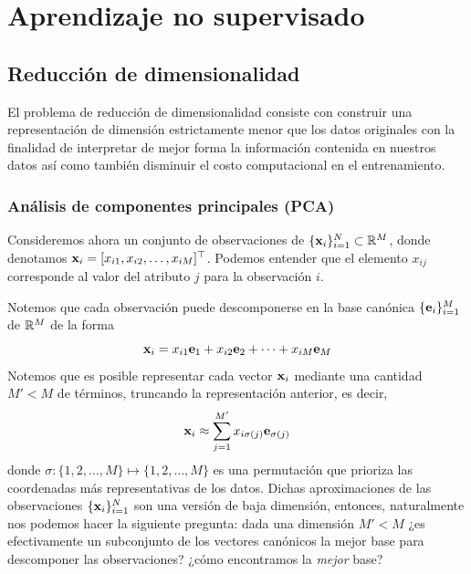 
\section{Aprendizaje no supervisado}

\subsection{Reducción de dimensionalidad}

El problema de reducción de dimensionalidad consiste con construir una representación de dimensión estrictamente menor que los datos originales con la finalidad de interpretar de mejor forma la información contenida en nuestros datos así como también disminuir el costo computacional en el entrenamiento.

\subsubsection{Análisis de componentes principales (PCA)}

Consideremos ahora un conjunto de observaciones de $\{\mathbf{x}_i\}_{i=1}^N\subset\mathbb{R}^M$, donde denotamos $\mathbf{x}_i=[x_{i1},x_{i2},\ldots,x_{iM}]^\top$. Podemos entender que el elemento $x_{ij}$ corresponde al valor del atributo $j$ para la observación $i$. 

Notemos que cada observación puede descomponerse en la base canónica $\{\mathbf{e}_i\}_{i=1}^M$ de $\mathbb{R}^M$ de la forma 
\begin{equation}
	\mathbf{x}_i = x_{i1}\mathbf{e}_1 +  x_{i2}\mathbf{e}_2 + \cdots + x_{iM}\mathbf{e}_M 		
\end{equation}
Notemos que es posible representar cada vector $\mathbf{x}_i$ mediante una cantidad $M'<M$ de términos, truncando la representación anterior, es decir,  
\begin{equation}
	\mathbf{x}_i \approx \sum_{j=1}^{M'} x_{i\sigma(j)}\mathbf{e}_{\sigma(j)}
\end{equation}
donde $\sigma:\{1,2,\ldots,M\}\mapsto\{1,2,\ldots,M\}$ es una permutación que prioriza las coordenadas más representativas de los datos. Dichas aproximaciones de las observaciones $\{\mathbf{x}_i\}_{i=1}^N$ son una versión de baja dimensión, entonces, naturalmente nos podemos hacer la siguiente pregunta: dada una dimensión $M'<M$  ¿es efectivamente un subconjunto de los vectores canónicos la mejor base para descomponer las observaciones?  ¿cómo encontramos la \emph{mejor} base?

